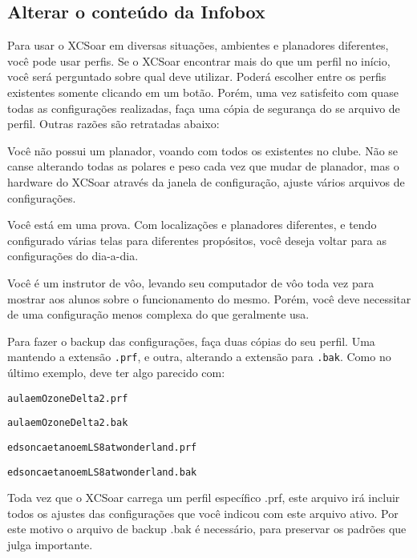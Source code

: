 \documentclass[a4paper,12pt]{refrep}
\begin{document}
\subsection{\textcolor{flashblue}{Alterar o conteúdo da Infobox}}
Para usar o XCSoar em diversas situações, ambientes e planadores diferentes, você pode usar perfis.  Se o XCSoar encontrar mais do que um perfil no início, você será perguntado sobre qual deve utilizar.  Poderá escolher entre os perfis existentes somente clicando em um botão.  Porém, uma vez satisfeito com quase todas as configurações realizadas, faça uma cópia de segurança do se arquivo de perfil.  Outras razões são retratadas abaixo:
\begin{compactitem}
\item Você não possui um planador, voando com todos os existentes no clube.  Não se canse alterando todas as polares e peso cada vez que mudar de planador, mas o hardware do XCSoar através da janela de configuração, ajuste vários arquivos de configurações.
\item Você está em uma prova.  Com localizações e planadores diferentes, e tendo configurado várias telas para diferentes propósitos, você deseja voltar para as configurações do dia-a-dia.
\item Você é um instrutor de vôo, levando seu computador de vôo toda vez para mostrar aos alunos sobre o funcionamento do mesmo.  Porém, você deve necessitar de uma configuração menos complexa do que geralmente usa.
\end{compactitem}
Para fazer o backup das configurações, faça duas cópias do seu perfil.  Uma mantendo a extensão \verb+.prf+, e outra, alterando a extensão para \verb+.bak+. Como no último exemplo, deve ter algo parecido com:
\begin{compactitem}
\item\verb+aulaemOzoneDelta2.prf+
\item\verb+aulaemOzoneDelta2.bak+
\item\verb+edsoncaetanoemLS8atwonderland.prf+
\item\verb+edsoncaetanoemLS8atwonderland.bak+
\end{compactitem}
Toda vez que o XCSoar carrega um perfil específico .prf, este arquivo irá incluir todos os ajustes das configurações que você indicou com este arquivo ativo.  Por este motivo o arquivo de backup .bak é necessário, para preservar os padrões que julga importante.
\end{document}
